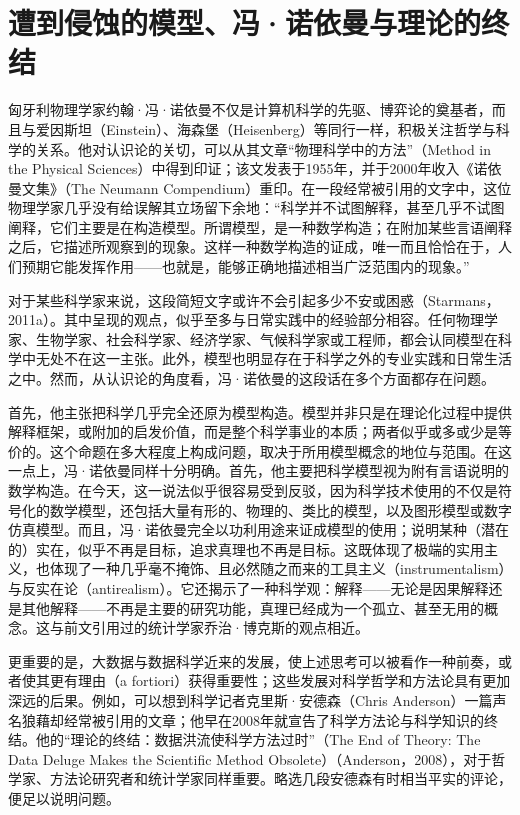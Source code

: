 \section{遭到侵蚀的模型、冯·诺依曼与理论的终结}

匈牙利物理学家约翰·冯·诺依曼不仅是计算机科学的先驱、博弈论的奠基者，而且与爱因斯坦（Einstein）、海森堡（Heisenberg）等同行一样，积极关注哲学与科学的关系。他对认识论的关切，可以从其文章“物理科学中的方法”（Method in the Physical Sciences）中得到印证；该文发表于1955年，并于2000年收入《诺依曼文集》（The Neumann Compendium）重印。在一段经常被引用的文字中，这位物理学家几乎没有给误解其立场留下余地：“科学并不试图解释，甚至几乎不试图阐释，它们主要是在构造模型。所谓模型，是一种数学构造；在附加某些言语阐释之后，它描述所观察到的现象。这样一种数学构造的证成，唯一而且恰恰在于，人们预期它能发挥作用——也就是，能够正确地描述相当广泛范围内的现象。”

对于某些科学家来说，这段简短文字或许不会引起多少不安或困惑（Starmans，2011a）。其中呈现的观点，似乎至多与日常实践中的经验部分相容。任何物理学家、生物学家、社会科学家、经济学家、气候科学家或工程师，都会认同模型在科学中无处不在这一主张。此外，模型也明显存在于科学之外的专业实践和日常生活之中。然而，从认识论的角度看，冯·诺依曼的这段话在多个方面都存在问题。

首先，他主张把科学几乎完全还原为模型构造。模型并非只是在理论化过程中提供解释框架，或附加的启发价值，而是整个科学事业的本质；两者似乎或多或少是等价的。这个命题在多大程度上构成问题，取决于所用模型概念的地位与范围。在这一点上，冯·诺依曼同样十分明确。首先，他主要把科学模型视为附有言语说明的数学构造。在今天，这一说法似乎很容易受到反驳，因为科学技术使用的不仅是符号化的数学模型，还包括大量有形的、物理的、类比的模型，以及图形模型或数字仿真模型。而且，冯·诺依曼完全以功利用途来证成模型的使用；说明某种（潜在的）实在，似乎不再是目标，追求真理也不再是目标。这既体现了极端的实用主义，也体现了一种几乎毫不掩饰、且必然随之而来的工具主义（instrumentalism）与反实在论（antirealism）。它还揭示了一种科学观：解释——无论是因果解释还是其他解释——不再是主要的研究功能，真理已经成为一个孤立、甚至无用的概念。这与前文引用过的统计学家乔治·博克斯的观点相近。

更重要的是，大数据与数据科学近来的发展，使上述思考可以被看作一种前奏，或者使其更有理由（a fortiori）获得重要性；这些发展对科学哲学和方法论具有更加深远的后果。例如，可以想到科学记者克里斯·安德森（Chris Anderson）一篇声名狼藉却经常被引用的文章；他早在2008年就宣告了科学方法论与科学知识的终结。他的“理论的终结：数据洪流使科学方法过时”（The End of Theory: The Data Deluge Makes the Scientific Method Obsolete）（Anderson，2008），对于哲学家、方法论研究者和统计学家同样重要。略选几段安德森有时相当平实的评论，便足以说明问题。

